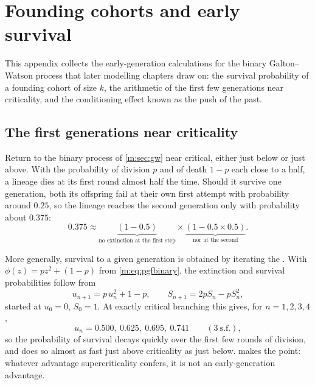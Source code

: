 \section{Founding cohorts and early survival}
\label{m:app:cohorts}

This appendix collects the early-generation calculations for the binary
Galton--Watson process that later modelling chapters draw on: the survival
probability of a founding cohort of size $k$, the arithmetic of the first few
generations near criticality, and the conditioning effect known as the push of
the past.

\subsection*{The first generations near criticality}

Return to the binary process of \cref{m:sec:gw} near critical, either just below
or just above. With the probability of division $p$ and of death $1-p$ each close
to a half, a lineage dies at its first round almost half the time. Should it
survive one generation, both its offspring fail at their own first attempt with
probability around $0.25$, so the lineage reaches the second generation only with
probability about $0.375$:
\begin{equation*}
0.375 \approx
\underbrace{(1-0.5)}_{\text{no extinction at the first step}}\times
\underbrace{(1-0.5\times0.5)}_{\text{nor at the second}} .
\end{equation*}

More generally, survival to a given generation is obtained by iterating the \pgf{}.
With $\phi(z)=pz^2+(1-p)$ from \cref{m:eq:pgfbinary}, the extinction and survival
probabilities follow from
\begin{equation}
\label{m:eq:ext}
u_{n+1} = p\,u_n^2 + 1-p,
\qquad
S_{n+1} = 2pS_n - pS_n^2 ,
\end{equation}
started at $u_0=0$, $S_0=1$. At exactly critical branching this gives, for
$n=1,2,3,4$,
\begin{equation*}
u_n = 0.500,\ 0.625,\ 0.695,\ 0.741\qquad(3\ \text{s.f.}),
\end{equation*}
so the probability of survival decays quickly over the first few rounds of
division, and does so almost as fast just above criticality as just below.
 makes the point: whatever advantage supercriticality
confers, it is not an early-generation advantage.

